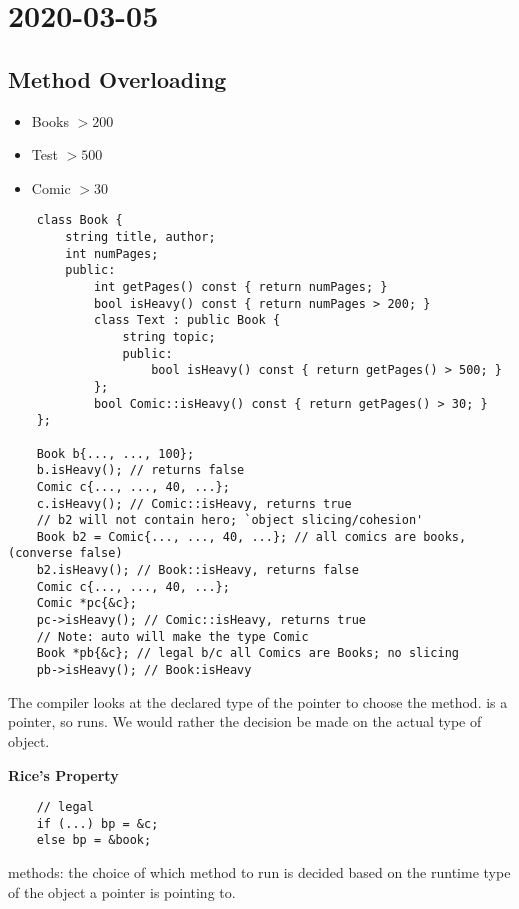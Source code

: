 \section{2020-03-05}
\subsection{Method Overloading}
\begin{itemize}
    \item Books $ > 200 $
    \item Test $ > 500 $
    \item Comic $ > 30 $
\end{itemize}

\begin{lstlisting}
    class Book {
        string title, author;
        int numPages;
        public:
            int getPages() const { return numPages; }
            bool isHeavy() const { return numPages > 200; }
            class Text : public Book {
                string topic;
                public:
                    bool isHeavy() const { return getPages() > 500; }
            };
            bool Comic::isHeavy() const { return getPages() > 30; }
    };
    
    Book b{..., ..., 100};
    b.isHeavy(); // returns false
    Comic c{..., ..., 40, ...};
    c.isHeavy(); // Comic::isHeavy, returns true
    // b2 will not contain hero; `object slicing/cohesion'
    Book b2 = Comic{..., ..., 40, ...}; // all comics are books, (converse false)
    b2.isHeavy(); // Book::isHeavy, returns false
    Comic c{..., ..., 40, ...};
    Comic *pc{&c};
    pc->isHeavy(); // Comic::isHeavy, returns true
    // Note: auto will make the type Comic
    Book *pb{&c}; // legal b/c all Comics are Books; no slicing
    pb->isHeavy(); // Book:isHeavy
\end{lstlisting}
The compiler looks at the declared type of the pointer to choose the method.
 is a  pointer, so  runs. We
would rather the decision be made on the actual type of object.

\textbf{Rice's Property}
\begin{lstlisting}
    // legal
    if (...) bp = &c;
    else bp = &book;
\end{lstlisting}

 methods: the choice of which method to run is decided
based on the runtime type of the object a pointer is pointing to.

